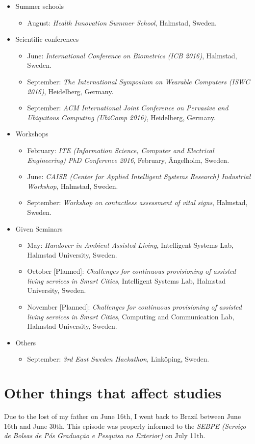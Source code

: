 \documentclass[]{report}
\begin{document}
\begin{itemize} 
	\item Summer schools
		\begin{itemize}
			\item August: \textit{Health Innovation Summer School}, Halmstad, Sweden.
		\end{itemize}
	\item Scientific conferences
		\begin{itemize}
			\item June: \textit{International Conference on Biometrics (ICB 2016)}, Halmstad, Sweden.
			\item September: \textit{The International Symposium on Wearable Computers (ISWC 2016)}, Heidelberg, Germany.
			\item September: \textit{ACM International Joint Conference on Pervasive and Ubiquitous Computing (UbiComp 2016)}, Heidelberg, Germany.
		\end{itemize}
	\item Workshops
		\begin{itemize}
			\item February: \textit{ITE (Information Science, Computer and Electrical Engineering) PhD Conference 2016}, February, \"{A}ngelholm, Sweden.
			\item June: \textit{CAISR (Center for Applied Intelligent Systems Research) Industrial Workshop}, Halmstad, Sweden.
			\item September: \textit{Workshop on contactless assessment of vital signs}, Halmstad, Sweden.
		\end{itemize}
	\item Given Seminars
		\begin{itemize}
			\item May: \textit{Handover in Ambient Assisted Living}, Intelligent Systems Lab, Halmstad University, Sweden.
			\item October [Planned]: \textit{Challenges for continuous provisioning of assisted living services in Smart Cities}, Intelligent Systems Lab, Halmstad University, Sweden.
			\item November [Planned]: \textit{Challenges for continuous provisioning of assisted living services in Smart Cities}, Computing and Communication Lab, Halmstad University, Sweden.
		\end{itemize}
	\item Others
		\begin{itemize}
			\item September: \textit{3rd East Sweden Hackathon}, Link\"{o}ping, Sweden.
		\end{itemize}
\end{itemize}

\section*{Other things that affect studies}

Due to the lost of my father on June 16th, I went back to Brazil between June 16th and June 30th. This episode was properly informed to the \textit{SEBPE (Servi\c{c}o de Bolsas de P\'{o}s Gradua\c{c}\~{a}o e Pesquisa no Exterior)} on July 11th. 

{}

\end{document}
